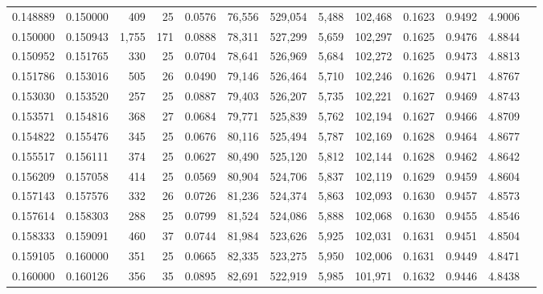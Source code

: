 \begin{tabular}{rrrrrrrrrrrrr}
0.148889 & 0.150000 &    409 &    25 &                                     0.0576 &  76,556 & 529,054 &   5,488 & 102,468 & 0.1623 & 0.9492 & 4.9006 \\
0.150000 & 0.150943 &  1,755 &   171 &                                     0.0888 &  78,311 & 527,299 &   5,659 & 102,297 & 0.1625 & 0.9476 & 4.8844 \\
0.150952 & 0.151765 &    330 &    25 &                                     0.0704 &  78,641 & 526,969 &   5,684 & 102,272 & 0.1625 & 0.9473 & 4.8813 \\
0.151786 & 0.153016 &    505 &    26 &                                     0.0490 &  79,146 & 526,464 &   5,710 & 102,246 & 0.1626 & 0.9471 & 4.8767 \\
0.153030 & 0.153520 &    257 &    25 &                                     0.0887 &  79,403 & 526,207 &   5,735 & 102,221 & 0.1627 & 0.9469 & 4.8743 \\
0.153571 & 0.154816 &    368 &    27 &                                     0.0684 &  79,771 & 525,839 &   5,762 & 102,194 & 0.1627 & 0.9466 & 4.8709 \\
0.154822 & 0.155476 &    345 &    25 &                                     0.0676 &  80,116 & 525,494 &   5,787 & 102,169 & 0.1628 & 0.9464 & 4.8677 \\
0.155517 & 0.156111 &    374 &    25 &                                     0.0627 &  80,490 & 525,120 &   5,812 & 102,144 & 0.1628 & 0.9462 & 4.8642 \\
0.156209 & 0.157058 &    414 &    25 &                                     0.0569 &  80,904 & 524,706 &   5,837 & 102,119 & 0.1629 & 0.9459 & 4.8604 \\
0.157143 & 0.157576 &    332 &    26 &                                     0.0726 &  81,236 & 524,374 &   5,863 & 102,093 & 0.1630 & 0.9457 & 4.8573 \\
0.157614 & 0.158303 &    288 &    25 &                                     0.0799 &  81,524 & 524,086 &   5,888 & 102,068 & 0.1630 & 0.9455 & 4.8546 \\
0.158333 & 0.159091 &    460 &    37 &                                     0.0744 &  81,984 & 523,626 &   5,925 & 102,031 & 0.1631 & 0.9451 & 4.8504 \\
0.159105 & 0.160000 &    351 &    25 &                                     0.0665 &  82,335 & 523,275 &   5,950 & 102,006 & 0.1631 & 0.9449 & 4.8471 \\
0.160000 & 0.160126 &    356 &    35 &                                     0.0895 &  82,691 & 522,919 &   5,985 & 101,971 & 0.1632 & 0.9446 & 4.8438 \\

\end{tabular}
